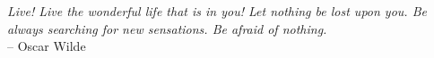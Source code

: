 \clearpage

\narrowlinespacing


\vspace*{7cm}
\begin{myquote}
\begin{flushright}
\textit{Live! Live the wonderful life that is in you! Let nothing be lost upon you. Be always searching for new sensations. Be afraid of nothing.} \\-- Oscar Wilde
\end{flushright}
\end{myquote}



\normallinespacing